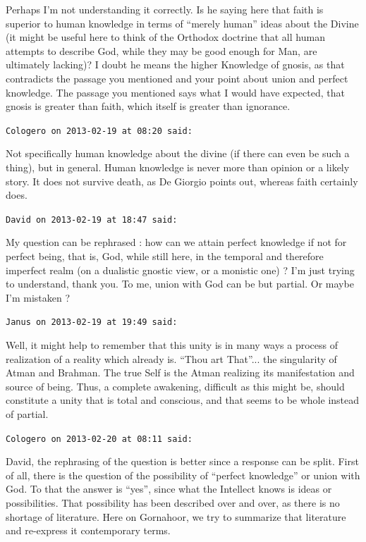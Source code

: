\begin{footnotesize}
\begin{sffamily}
Perhaps I'm not understanding it correctly. Is he saying here that faith is superior to human knowledge in terms of ``merely human'' ideas about the Divine (it might be useful here to think of the Orthodox doctrine that all human attempts to describe God, while they may be good enough for Man, are ultimately lacking)? I doubt he means the higher Knowledge of gnosis, as that contradicts the passage you mentioned and your point about union and perfect knowledge. The passage you mentioned says what I would have expected, that gnosis is greater than faith, which itself is greater than ignorance.

\hfill

\texttt{Cologero on 2013-02-19 at 08:20 said:}

Not specifically human knowledge about the divine (if there can even be such a thing), but in general. Human knowledge is never more than opinion or a likely story. It does not survive death, as De Giorgio points out, whereas faith certainly does.

\hfill

\texttt{David on 2013-02-19 at 18:47 said:}

My question can be rephrased : how can we attain perfect knowledge if not for perfect being, that is, God, while still here, in the temporal and therefore imperfect realm (on a dualistic gnostic view, or a monistic one) ? I'm just trying to understand, thank you. To me, union with God can be but partial. Or maybe I'm mistaken ?

\hfill

\texttt{Janus on 2013-02-19 at 19:49 said:}

Well, it might help to remember that this unity is in many ways a process of realization of a reality which already is. ``Thou art That''... the singularity of Atman and Brahman. The true Self is the Atman realizing its manifestation and source of being. Thus, a complete awakening, difficult as this might be, should constitute a unity that is total and conscious, and that seems to be whole instead of partial.

\hfill

\texttt{Cologero on 2013-02-20 at 08:11 said:}

David, the rephrasing of the question is better since a response can be split. First of all, there is the question of the possibility of ``perfect knowledge'' or union with God. To that the answer is ``yes'', since what the Intellect knows is ideas or possibilities. That possibility has been described over and over, as there is no shortage of literature. Here on Gornahoor, we try to summarize that literature and re-express it contemporary terms.


\end{sffamily}
\end{footnotesize}
